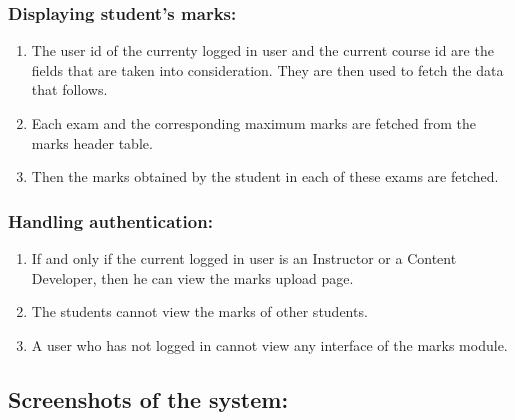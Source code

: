 \subsubsection*{Displaying student's marks:}
\begin{enumerate}
	\item The user id of the currenty logged in user and the current course id are the fields that are taken into consideration. They are then used to fetch the data that follows.
	\item Each exam and the corresponding maximum marks are fetched from the marks header table.
	\item Then the marks obtained by the student in each of these exams are fetched.
\end{enumerate}

\subsubsection*{Handling authentication:}
\begin{enumerate}
	\item If and only if the current logged in user is an Instructor or a Content Developer, then he can view the marks upload page.
	\item The students cannot view the marks of other students.
	\item A user who has not logged in cannot view any interface of the marks module.
\end{enumerate}

\newpage

\subsection*{Screenshots of the system:}

